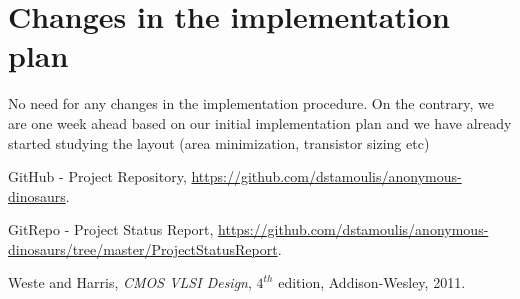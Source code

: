 \documentclass[conference]{IEEEtran}
\begin{document}
\section{Changes in the implementation plan}

No need for any changes in the implementation
procedure. On the contrary, we are one week ahead
based on our initial implementation plan and we
have already started studying the
layout (area minimization, transistor sizing etc)






\begin{thebibliography}{1}

GitHub - Project Repository,
\href{https://github.com/dstamoulis/anonymous-dinosaurs}{https://github.com/dstamoulis/anonymous-dinosaurs}.



GitRepo - Project Status Report,
\href{https://github.com/dstamoulis/anonymous-dinosaurs/tree/master/ProjectStatusReport}{https://github.com/dstamoulis/anonymous-dinosaurs/tree/master/ProjectStatusReport}.

Weste and Harris, \emph{CMOS VLSI Design}, $4^{th}$ edition, Addison-Wesley, 2011.	



\end{thebibliography}




\end{document}
